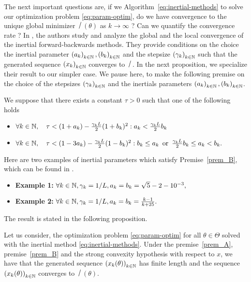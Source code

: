 The next important questions are, if we Algorithm~\ref{eq:inertial-methods} to solve our optimization problem \eqref{eq:param-optim}, do we have convergence to the unique global minimizer $\xsol(\theta)$ as $k\to\infty$ ? Can we quantify the convergence rate ? In \cite{liang_activity_2017}, the authors  study and analyze the global and the local convergence of the  inertial forward-backwards methods. They provide conditions on the choice the inertial parameter $\left(a_{k}\right)_{k\in\mathbb{N}},\left(b_{k}\right)_{k\in\mathbb{N}}$ and  the stepsize $\left(\gamma_{k}\right)_{k\in\mathbb{N}}$ such that the generated sequence $\left(x_{k}\right)_{k\in\mathbb{N}}$ converges to $\xsol$. In the next proposition, we specialize their result to our simpler case.   
We pause here,  to make the following premise on the choice of the stepsizes $\left(\gamma_{k}\right)_{k\in\mathbb{N}}$ and the inertials parameters $\left(a_{k}\right)_{k\in\mathbb{N}},\left(b_{k}\right)_{k\in\mathbb{N}}$.
\begin{premise}\label{prem_B} We suppose that there exists a constant $\tau>0$ such that one of the following holds
\begin{itemize}
\item $\forall k\in \mathbb{N},\quad\tau<(1+a_{k})-\frac{\gamma_{k} L}{2}(1+b_{k})^2:a_{k}<\frac{\gamma_{k} L}{2}b_k$
\item $\forall k\in \mathbb{N},\quad\tau<(1-3a_{k})-\frac{\gamma_{k} L}{2}(1-b_{k})^2:b_{k}\leq a_{k} \enskip \text{or} \enskip \frac{\gamma_{k} L}{2}b_k\leq a_{k}<b_{k}.$
\end{itemize}
\end{premise}
\begin{remark}Here are two examples of inertial parameters which satisfy Premise~\ref{prem_B}, which can be found in  \cite[Section~5]{liang_activity_2017}. 
\begin{itemize}
\item \textbf{Example 1:} $\forall k\in\mathbb{N}, \gamma_{k}=1/L, a_{k}=b_{k} =\sqrt{5}-2-10^{-3},$
\item \textbf{Example 2:} $\forall k\in\mathbb{N}, \gamma_{k}=1/L, a_{k}=b_{k} =\frac{k-1}{k+25}.$
\end{itemize}
\end{remark}
The result is stated in the following proposition.
\begin{proposition} \label{pro:conv-iters} Let us  consider, the optimization problem \eqref{eq:param-optim} for all $\theta\in\Theta$ solved with the inertial method \eqref{eq:inertial-methods}. Under the premise~\ref{prem_A}, premise~\ref{prem_B} and the strong convexity hypothesis with respect to $x$, we have that the generated sequence $\left(x_{k}(\theta)\right)_{k\in\mathbb{N}}$ has finite length and the sequence $\left(x_{k}(\theta)\right)_{k\in\mathbb{N}}$ converges to $\xsol(\theta)$. 
\end{proposition}
